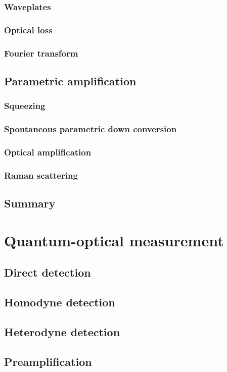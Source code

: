 \documentclass{book}
\begin{document}
\subsection{Waveplates}
\subsection{Optical loss}
\subsection{Fourier transform}
\section{Parametric amplification}
\subsection{Squeezing}
\subsection{Spontaneous parametric down conversion}
\subsection{Optical amplification}
\subsection{Raman scattering}
\section{Summary}

\chapter{Quantum-optical measurement}
\section{Direct detection}
\section{Homodyne detection}
\section{Heterodyne detection}
\section{Preamplification}
\end{document}
